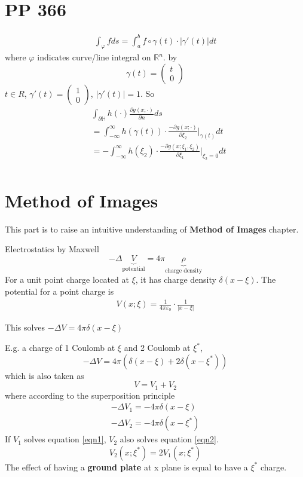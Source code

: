 \documentclass{article}
\begin{document}
\section{PP 366}
\begin{align*}
	\int_{\varphi} f ds = \int_a^b f \circ \gamma(t)\cdot  |\gamma'(t)|dt
\end{align*}
where $\varphi$ indicates curve/line integral on $\mathbb{R}^n$. by
\[
	\gamma (t) = \begin{pmatrix}
		t \\ 0
	\end{pmatrix}
\]
$t \in R$, $\gamma'(t) = \begin{pmatrix} 1\\0 \end{pmatrix}$, $|\gamma'(t) | = 1$.
So
\begin{align*}
	&\int_{\partial \mathbb{H}} h(\cdot ) \frac{\partial g(x;\cdot )}{\partial n} ds \\
	&= \int_{-\infty}^\infty h(\gamma(t))\cdot \frac{-\partial g(x;\cdot )}{\partial \xi_2}|_{\gamma(t)} dt \\
	&= - \int _{- \infty }^{\infty}h(\xi_2)\cdot \frac{-\partial g(x;\xi_1,\xi_2 )}{\partial \xi_1}|_{\xi_2 = 0} dt \\
\end{align*}

\section{Method of Images}
\begin{tcolorbox}[colback=green!10!white]
This part is to raise an intuitive understanding of \textbf{Method of Images} chapter.
\end{tcolorbox}
Electrostatics by Maxwell
\[
	- \Delta \underbrace{V}_{\text{potential}} = 4 \pi \underbrace{\rho}_{\text{charge density}}
\]
For a unit point charge located at $\xi$, it has charge density $\delta(x- \xi)$. The potential for a point charge is
\begin{align*}
	V(x;\xi) = \frac{1}{4 \pi \varepsilon_0}\cdot  \frac{1}{|x-\xi|}
\end{align*}

This solves $-\Delta V = 4 \pi \delta(x-\xi)$

\begin{tcolorbox}[colback = blue!10!white]
E.g. a charge of 1 Coulomb at $\xi$ and 2 Coulomb at $\xi^*$,
\[
	- \Delta V = 4 \pi (\delta(x- \xi)+ 2 \delta(x- \xi^*))
\]
which is also taken as 
\[
	V = V_1 + V_2
\]
where according to the superposition principle
\begin{align}
	- \Delta V_1 = - 4 \pi \delta(x- \xi) \label{eqn1} \\
	- \Delta V_2 = - 4 \pi \delta(x- \xi^*) \label{eqn2} 
\end{align}
If $V_1$ solves equation \eqref{eqn1}, $V_2$ also solves equation \eqref{eqn2}. 
\[
	V_2(x; \xi^*) = 2 V_1(x;\xi^*)
\]
The effect of having a \textbf{ground plate} at x plane is equal to have a $\xi^*$ charge.
\end{tcolorbox}
\end{document}
